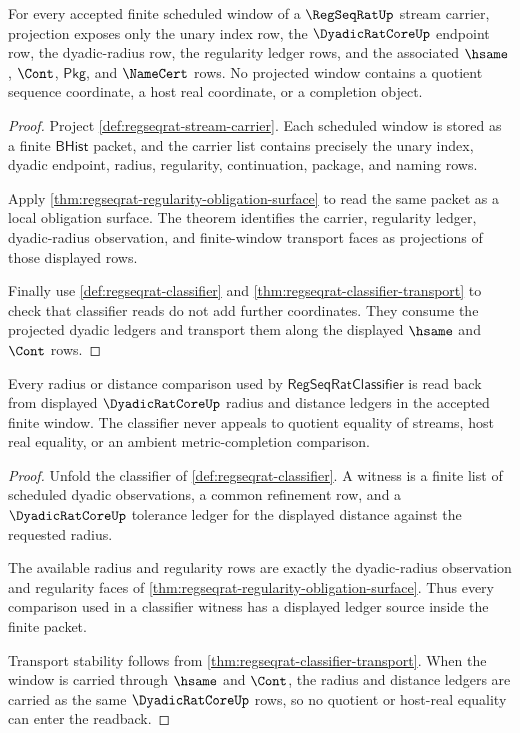 \begin{theorem}
\label{thm:regseqrat-scheduled-window-projection}
For every accepted finite scheduled window of a $\RegSeqRatUp$ stream carrier, projection exposes only the unary index row, the $\DyadicRatCoreUp$ endpoint row, the dyadic-radius row, the regularity ledger rows, and the associated $\hsame$, $\Cont$, $\mathsf{Pkg}$, and $\NameCert$ rows. No projected window contains a quotient sequence coordinate, a host real coordinate, or a completion object.
\end{theorem}
\begin{proof}
Project \autoref{def:regseqrat-stream-carrier}. Each scheduled window is stored as a finite $\mathsf{BHist}$ packet, and the carrier list contains precisely the unary index, dyadic endpoint, radius, regularity, continuation, package, and naming rows.

Apply \autoref{thm:regseqrat-regularity-obligation-surface} to read the same packet as a local obligation surface. The theorem identifies the carrier, regularity ledger, dyadic-radius observation, and finite-window transport faces as projections of those displayed rows.

Finally use \autoref{def:regseqrat-classifier} and \autoref{thm:regseqrat-classifier-transport} to check that classifier reads do not add further coordinates. They consume the projected dyadic ledgers and transport them along the displayed $\hsame$ and $\Cont$ rows.
\end{proof}

\begin{theorem}
\label{thm:regseqrat-dyadic-radius-ledger-readback}
Every radius or distance comparison used by $\mathsf{RegSeqRatClassifier}$ is read back from displayed $\DyadicRatCoreUp$ radius and distance ledgers in the accepted finite window. The classifier never appeals to quotient equality of streams, host real equality, or an ambient metric-completion comparison.
\end{theorem}
\begin{proof}
Unfold the classifier of \autoref{def:regseqrat-classifier}. A witness is a finite list of scheduled dyadic observations, a common refinement row, and a $\DyadicRatCoreUp$ tolerance ledger for the displayed distance against the requested radius.

The available radius and regularity rows are exactly the dyadic-radius observation and regularity faces of \autoref{thm:regseqrat-regularity-obligation-surface}. Thus every comparison used in a classifier witness has a displayed ledger source inside the finite packet.

Transport stability follows from \autoref{thm:regseqrat-classifier-transport}. When the window is carried through $\hsame$ and $\Cont$, the radius and distance ledgers are carried as the same $\DyadicRatCoreUp$ rows, so no quotient or host-real equality can enter the readback.
\end{proof}


